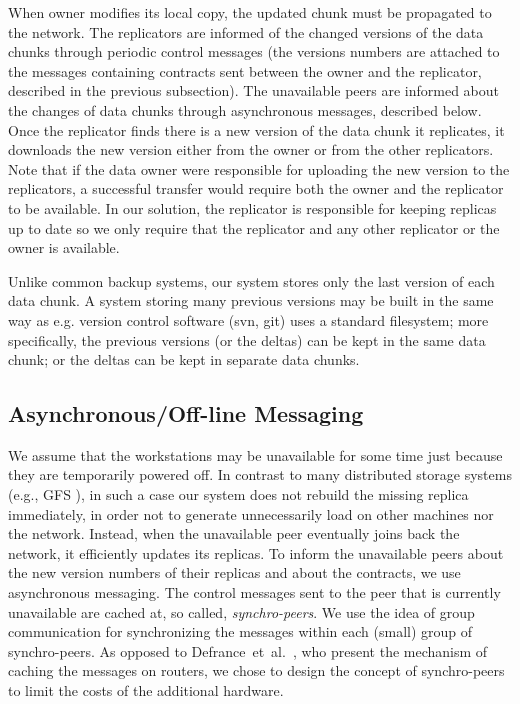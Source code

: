 \documentclass[10pt, final, conference, letterpaper]{IEEEtran}
\begin{document}
When owner modifies its local copy, the updated chunk must be propagated to the network.
The replicators are informed of the changed versions of the data chunks through periodic control messages (the versions numbers are attached to the messages containing contracts sent between the owner and the replicator, described in the previous subsection). The unavailable peers are informed about the changes of data chunks through asynchronous messages, described below. Once the replicator finds there is a new version of the data chunk it replicates, it downloads the new version either from the owner or from the other replicators. Note that if the data owner were responsible for uploading the new version to the replicators, a successful transfer would require both the owner and the replicator to be available. In our solution, the replicator is responsible for keeping replicas up to date so we only require that the replicator and any other replicator or the owner is available. 

Unlike common backup systems, our system stores only the last version of each data chunk.
A system storing many previous versions may be built in the same way as e.g. version control software (svn, git) uses a standard filesystem; more specifically, the previous versions (or the deltas) can be kept in the same data chunk; or the deltas can be kept in separate data chunks.

\subsection{Asynchronous/Off-line Messaging}\label{sec::asynchronous-mess}

We assume that the workstations may be unavailable for some time just because they are temporarily powered off. In contrast to many distributed storage systems (e.g., GFS \cite{googlefs}), in such a case our system does not rebuild the missing replica immediately, in order not to generate unnecessarily load on other machines nor the network. Instead, when the unavailable peer eventually joins back the network, it efficiently updates its replicas.
To inform the unavailable peers about the new version numbers of their replicas and about the contracts, we use asynchronous messaging.
The control messages sent to the peer that is currently unavailable are cached at, so called, \emph{synchro-peers}. We use the idea of group communication for synchronizing the messages within each (small) group of synchro-peers. As opposed to Defrance~et~al.~\cite{edgeBuffering}, who present the mechanism of caching the messages on routers, we chose to design the concept of synchro-peers to limit the costs of the additional hardware.
\end{document}
